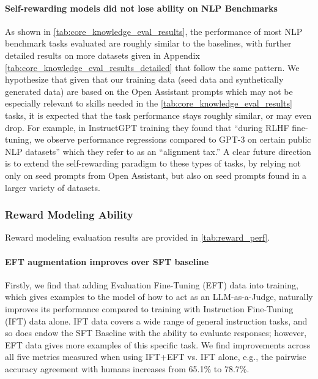 \documentclass{article}
\begin{document}
\paragraph{Self-rewarding models did not lose ability on NLP Benchmarks} 
As shown in \autoref{tab:core_knowledge_eval_results}, the performance of most NLP benchmark tasks evaluated are roughly similar to the baselines, with further detailed results on more datasets given in Appendix \autoref{tab:core_knowledge_eval_results_detailed}  that follow the same pattern.
 We hypothesize that given that our training data (seed data and synthetically generated data) are based on the Open Assistant prompts which may not be especially relevant to skills needed in the \autoref{tab:core_knowledge_eval_results} tasks, it is expected that the task performance stays roughly similar, or may even drop. 
 For example, in InstructGPT training \citep{ouyang2022training}
 they found that ``during RLHF fine-tuning, we observe performance regressions compared
to GPT-3 on certain public NLP datasets'' which they refer to as an ``alignment tax.'' 
 A clear future direction is to extend the self-rewarding paradigm to these types of tasks, by relying not only on seed prompts from Open Assistant, but also on seed prompts found in a larger variety of datasets. 








\subsubsection{Reward Modeling Ability}

Reward modeling evaluation results are provided in 
\autoref{tab:reward_perf}.

\paragraph{EFT augmentation improves over SFT baseline}
Firstly, we find that adding Evaluation Fine-Tuning (EFT) data into training, which gives examples to the model of how to act as an LLM-as-a-Judge, naturally improves its performance compared to training with Instruction Fine-Tuning (IFT) data alone. IFT data covers a wide range of general instruction tasks, and so does endow the SFT Baseline with the ability to evaluate responses; however, EFT data gives more examples of this specific task.  We find improvements across all five metrics measured when using IFT+EFT vs. IFT alone, e.g., 
the pairwise accuracy agreement with humans increases from 65.1\% to 78.7\%. 
\end{document}

